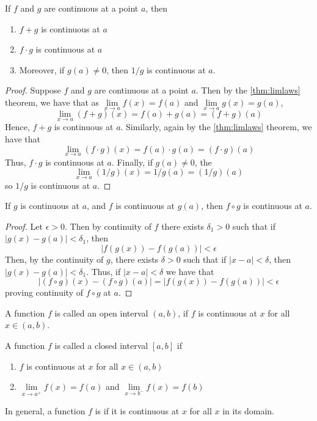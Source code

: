 \documentclass[12pt, a4paper, oneside, openright, titlepage]{book}
\begin{document}
\begin{thm}
    If $f$ and $g$ are continuous at a point $a$, then \begin{enumerate}
        \item $f+g$ is continuous at $a$
        \item $f\cdot g$ is continuous at $a$
        \item Moreover, if $g(a) \neq 0$, then $1/g$ is continuous at $a$.
    \end{enumerate}
\end{thm}
\begin{proof}
    Suppose $f$ and $g$ are continuous at a point $a$. Then by the \ref{thm:limlaws} theorem, we have that as $\lim\limits_{x\rightarrow a}f(x) = f(a)$ and $\lim\limits_{x\rightarrow a}g(x) = g(a)$, $$\lim\limits_{x\rightarrow a}(f+g)(x) = f(a) + g(a) = (f+g)(a)$$
    Hence, $f+g$ is continuous at $a$. Similarly, again by the \ref{thm:limlaws} theorem, we have that $$\lim\limits_{x\rightarrow a}(f\cdot g)(x) = f(a) \cdot g(a) = (f\cdot g)(a)$$
    Thus, $f\cdot g$ is continuous at $a$.
    Finally, if $g(a) \neq 0$, the $$\lim\limits_{x\rightarrow a}(1/g)(x) = 1/g(a) = (1/g)(a)$$
    so $1/g$ is continuous at $a$.
\end{proof}


\begin{thm}
    If $g$ is continuous at $a$, and $f$ is continuous at $g(a)$, then $f\circ g$ is continuous at $a$.
\end{thm}
\begin{proof}
    Let $\epsilon > 0$. Then by continuity of $f$ there exists $\delta_1 > 0$ such that if $|g(x) - g(a)| < \delta_1$, then $$|f(g(x)) - f(g(a))| < \epsilon$$
    Then, by the continuity of $g$, there exists $\delta > 0$ such that if $|x-a| < \delta$, then $|g(x) - g(a)| < \delta_1$. Thus, if $|x-a| < \delta$ we have that $$|(f\circ g)(x) - (f\circ g)(a)| = |f(g(x)) - f(g(a))| < \epsilon$$
    proving continuity of $f\circ g$ at $a$.
\end{proof}


\begin{defn}
    A function $f$ is called  an open interval $(a,b)$, if $f$ is continuous at $x$ for all $x \in (a,b)$.

    A function $f$ is called  a closed interval $[a,b]$ if \begin{enumerate}
        \item $f$ is continuous at $x$ for all $x \in (a,b)$
        \item $\lim\limits_{x\rightarrow a^+}f(x) = f(a)$ and $\lim\limits_{x\rightarrow b^-}f(x) = f(b)$
    \end{enumerate}

    In general, a function $f$ is  if it is continuous at $x$ for all $x$ in its domain.
\end{defn}
\end{document}

